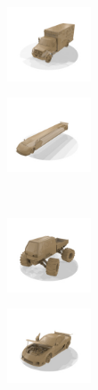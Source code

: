 \begin{figure}
    \centering
    \begin{subfigure}[t]{0.31\textwidth}
        \vspace{0px}
        \centering
        \begin{subfigure}[t]{0.475\textwidth}
            \vspace{0px}
            \centering
            \includegraphics[width=2.5cm,trim={0.25cm 0.5cm 1.5cm 1.5cm},clip]{gfx/appendix_experiments_shapenet/meshes/00014}
        \end{subfigure}
        \begin{subfigure}[t]{0.475\textwidth}
            \vspace{0px}
            \centering
            \includegraphics[width=2.5cm,trim={0.25cm 0.5cm 1.5cm 1.5cm},clip]{gfx/appendix_experiments_shapenet/meshes/00007}
        \end{subfigure}\\
        \begin{subfigure}[t]{0.475\textwidth}
            \vspace{0px}
            \centering
            \includegraphics[width=2.5cm,trim={0.25cm 0.5cm 1.5cm 1.5cm},clip]{gfx/appendix_experiments_shapenet/meshes/00017}
        \end{subfigure}
        \begin{subfigure}[t]{0.475\textwidth}
            \vspace{0px}
            \centering
            \includegraphics[width=2.5cm,trim={0.25cm 0.5cm 1.5cm 1.5cm},clip]{gfx/appendix_experiments_shapenet/meshes/00013}

\end{subfigure}
\end{subfigure}
\end{figure}
